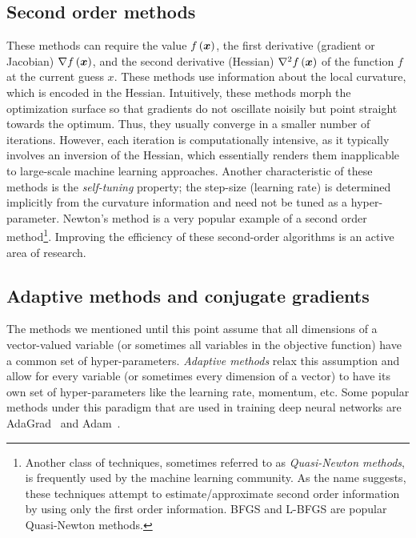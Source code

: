 \documentclass{article}
\begin{document}
\subsection{Second order methods} 
These methods can require the value $f\left({\bm{x}}\right)$, the first derivative (gradient or Jacobian) $\nabla f\left({\bm{x}}\right)$, and the second derivative (Hessian) $\nabla^2 f\left({\bm{x}}\right)$ of the function $f$ at the current guess $x$. 
These methods use information about the local curvature, which is encoded in the Hessian. 
Intuitively, these methods morph the optimization surface so that gradients do not oscillate noisily but point straight towards the optimum.
Thus, they usually converge in a smaller number of iterations.
However, each iteration is computationally intensive, as it typically involves an inversion of the Hessian, which essentially renders them inapplicable to large-scale machine learning approaches. 
Another characteristic of these methods is the \emph{self-tuning} property; the step-size (learning rate) is determined implicitly from the curvature information and need not be tuned as a hyper-parameter. 
Newton's method is a very popular example of a second order method\footnote{
    Another class of techniques, sometimes referred to as \emph{Quasi-Newton methods}, is frequently used by the machine learning community. 
    As the name suggests, these techniques attempt to estimate/approximate second order information by using only the first order information. 
    BFGS and L-BFGS are popular Quasi-Newton methods.
}. 
Improving the efficiency of these second-order algorithms is an active area of research.

\subsection{Adaptive methods and conjugate gradients} 
The methods we mentioned until this point assume that all dimensions of a vector-valued variable (or sometimes all variables in the objective function) have a common set of hyper-parameters. 
\emph{Adaptive methods} relax this assumption and allow for every variable (or sometimes every dimension of a vector) to have its own set of hyper-parameters like the learning rate, momentum, etc. 
Some popular methods under this paradigm that are used in training deep neural networks are AdaGrad~\cite{adagrad} and Adam~\cite{adam}. \\
\end{document}
